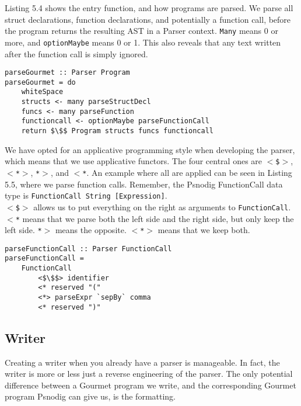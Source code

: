 Listing 5.4 shows the entry function, and how programs are parsed. We parse all struct declarations, function declarations, and potentially a function call, before the program returns the resulting AST in a Parser context. \texttt{Many} means 0 or more, and \texttt{optionMaybe} means 0 or 1. This also reveals that any text written after the function call is simply ignored. \hfill \\

\begin{lstlisting}[caption={Parsing Gourmet programs}, captionpos=b]
parseGourmet :: Parser Program
parseGourmet = do
    whiteSpace
    structs <- many parseStructDecl
    funcs <- many parseFunction
    functioncall <- optionMaybe parseFunctionCall
    return $\$$ Program structs funcs functioncall
\end{lstlisting}

We have opted for an applicative programming style when developing the parser, which means that we use applicative functors. The four central ones are \texttt{$<$\$$>$}, \texttt{$<$*$>$}, \texttt{*$>$}, and \texttt{$<$*}. An example where all are applied can be seen in Listing 5.5, where we parse function calls. Remember, the Psnodig FunctionCall data type is \texttt{FunctionCall String [Expression]}. \hfill \\

\texttt{$<$\$$>$} allows us to put everything on the right as arguments to \texttt{FunctionCall}. \texttt{$<$*} means that we parse both the left side and the right side, but only keep the left side. \texttt{*$>$} means the opposite. \texttt{$<$*$>$} means that we keep both. \hfill \\

\begin{lstlisting}[caption={Parsing Gourmet function calls}, captionpos=b]
parseFunctionCall :: Parser FunctionCall
parseFunctionCall =
    FunctionCall
        <$\$$> identifier
        <* reserved "("
        <*> parseExpr `sepBy` comma
        <* reserved ")"
\end{lstlisting}

\subsection{Writer}

Creating a writer when you already have a parser is manageable. In fact, the writer is more or less just a reverse engineering of the parser. The only potential difference between a Gourmet program we write, and the corresponding Gourmet program Psnodig can give us, is the formatting. \hfill \\

